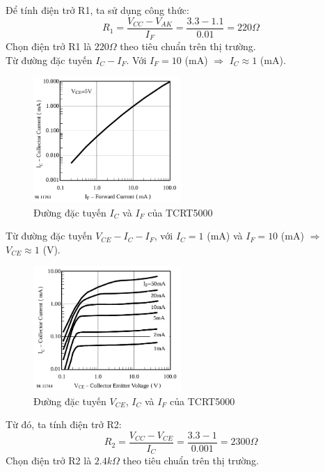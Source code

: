             Để tính điện trở R1, ta sử dụng công thức:
            \begin{equation}
                R_{1} = \frac{V_{CC} - V_{AK}}{I_{F}} = \frac{3.3 - 1.1}{0.01} = 220 \Omega
                \label{eq:4-1}
            \end{equation}
            \hspace*{0.6cm}Chọn điện trở R1 là $220 \Omega$ theo tiêu chuẩn trên thị trường.\\[0.4cm]
            \hspace*{0.6cm}Từ đường đặc tuyến $I_{C} - I_{F}$. Với $I_{F} = 10$ (mA) $\Rightarrow$ $I_{C} \approx 1$ (mA).
            \begin{figure}[H]
                \centering
                \includegraphics[width=0.5\textwidth]{pictures/chapter4/c4_p4_IC&IF.png}
                \caption{Đường đặc tuyến $I_{C}$ và $I_{F}$ của TCRT5000}
                \label{fig:4-4}
            \end{figure}
            Từ đường đặc tuyến $V_{CE} - I_{C} - I_{F}$, với $I_{C} = 1$ (mA) và $I_{F} = 10$ (mA) $\Rightarrow$ $V_{CE} \approx 1$ (V).\\
            \begin{figure}[H]
                \centering
                \includegraphics[width=0.5\textwidth]{pictures/chapter4/c4_p5_VCE&IC&IF.png}
                \caption{Đường đặc tuyến $V_{CE}$, $I_{C}$ và $I_{F}$ của TCRT5000}
                \label{fig:4-5}
            \end{figure}
            Từ đó, ta tính điện trở R2:
            \begin{equation}
                R_{2} = \frac{V_{CC} - V_{CE}}{I_{C}} = \frac{3.3 - 1}{0.001} = 2300 \Omega
                \label{eq:4-2}
            \end{equation}
            \hspace*{0.6cm}Chọn điện trở R2 là $2.4 k\Omega$ theo tiêu chuẩn trên thị trường.\\[0.4cm]
